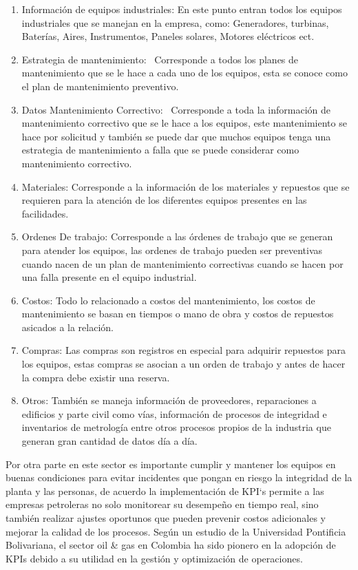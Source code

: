 \documentclass[
  11pt,
  bookmarksnumbered]{article}
\begin{document}
\begin{enumerate}
\def\labelenumi{\arabic{enumi}.}
\item
  Información de equipos industriales: En este punto entran todos los equipos industriales que se manejan en la empresa, como: Generadores, turbinas, Baterías, Aires, Instrumentos, Paneles solares, Motores eléctricos ect.
\item
  Estrategia de mantenimiento:~ Corresponde a todos los planes de mantenimiento que se le hace a cada uno de los equipos, esta se conoce como el plan de mantenimiento preventivo.
\item
  Datos Mantenimiento Correctivo:~ Corresponde a toda la información de mantenimiento correctivo que se le hace a los equipos, este mantenimiento se hace por solicitud y también se puede dar que muchos equipos tenga una estrategia de mantenimiento a falla que se puede considerar como mantenimiento correctivo.
\item
  Materiales: Corresponde a la información de los materiales y repuestos que se requieren para la atención de los diferentes equipos presentes en las facilidades.
\item
  Ordenes De trabajo: Corresponde a las órdenes de trabajo que se generan para atender los equipos, las ordenes de trabajo pueden ser preventivas cuando nacen de un plan de mantenimiento correctivas cuando se hacen por una falla presente en el equipo industrial.
\item
  Costos: Todo lo relacionado a costos del mantenimiento, los costos de mantenimiento se basan en tiempos o mano de obra y costos de repuestos asicados a la relación.
\item
  Compras: Las compras son registros en especial para adquirir repuestos para los equipos, estas compras se asocian a un orden de trabajo y antes de hacer la compra debe existir una reserva.
\item
  Otros: También se maneja información de proveedores, reparaciones a edificios y parte civil como vías, información de procesos de integridad e inventarios de metrología entre otros procesos propios de la industria que generan gran cantidad de datos día a día.
\end{enumerate}

Por otra parte en este sector es importante cumplir y mantener los equipos en buenas condiciones para evitar incidentes que pongan en riesgo la integridad de la planta y las personas, de acuerdo \textcite{ortiz2021importancia} la implementación de KPI`s permite a las empresas petroleras no solo monitorear su desempeño en tiempo real, sino también realizar ajustes oportunos que pueden prevenir costos adicionales y mejorar la calidad de los procesos.
Según un estudio de la Universidad Pontificia Bolivariana, el sector oil \& gas en Colombia ha sido pionero en la adopción de KPIs debido a su utilidad en la gestión y optimización de operaciones.
\end{document}
